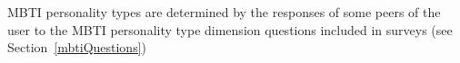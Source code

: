 MBTI personality types are determined by the responses of some peers of the user to the MBTI personality type dimension questions included in surveys (see Section~\ref{mbtiQuestions})